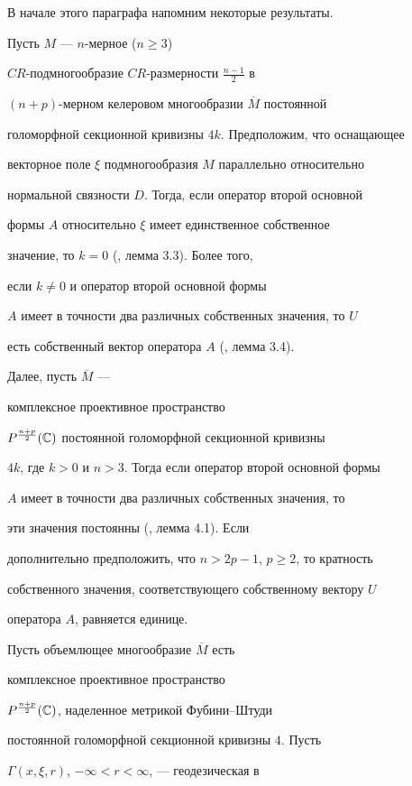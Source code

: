 В начале этого параграфа напомним некоторые результаты.


Пусть $M$ --- $n$-мерное ($n\ge 3$)


$CR$-подмногообразие $CR$-размерности $\frac{n-1}{2}$ в


$(n+p)$-мерном келеровом многообразии  $\overline M$ постоянной


голоморфной секционной кривизны $4k$. Предположим, что оснащающее


векторное поле $\xi$ подмногообразия $M$ параллельно относительно


нормальной связности $D$. Тогда, если оператор второй основной


формы $A$ относительно $\xi$ имеет единственное собственное


значение, то $k=0$ (\cite{DjoricOkumura}, лемма 3.3). Более того,


если  $k\ne 0$ и оператор второй основной формы


$A$ имеет в точности два различных собственных значения, то $U$


есть собственный вектор оператора $A$ (\cite{DjoricOkumura}, лемма 3.4).


Далее, пусть $\overline M$ ---


комплексное проективное пространство


$P^{\frac{n+p}{2}}(\Bbb C)$ постоянной голоморфной секционной кривизны


$4k$, где $k>0$ и $n>3$. Тогда если оператор второй основной формы


$A$ имеет в точности два различных собственных значения, то


эти значения постоянны (\cite{DjoricOkumura}, лемма 4.1). Если


дополнительно предположить, что $n>2p-1$, $p\ge 2$, то кратность


собственного значения, соответствующего собственному вектору $U$


оператора $A$, равняется единице.





Пусть объемлющее многообразие $\overline M$ есть


комплексное проективное пространство


$P^{\frac{n+p}{2}}(\Bbb C)$, наделенное метрикой Фубини--Штуди


постоянной голоморфной секционной кривизны $4$. Пусть


$\Gamma(x,\xi,r)$, $-\infty <r<\infty$, --- геодезическая в


